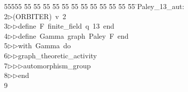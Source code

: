 %
%
\begin{tabbing}
55555 \= 55 \= 55 \= 55 \= 55 \= 55 \= 55 \= 55 \= 55 \= 55 \= 55 \= 55 \= 55 \= \>Paley\_13\_aut:\\[0pt]
2\>$\triangleright$\>(ORBITER)\ v\ 2\ \\[0pt]
3\>$\triangleright$\>$\triangleright$\>define\ F\ finite\_field\ q\ 13\ end\ \\[0pt]
4\>$\triangleright$\>$\triangleright$\>define\ Gamma\ graph\ Paley\ F\ end\ \\[0pt]
5\>$\triangleright$\>$\triangleright$\>with\ Gamma\ do\ \\[0pt]
6\>$\triangleright$\>$\triangleright$\>graph\_theoretic\_activity\ \\[0pt]
7\>$\triangleright$\>$\triangleright$\>$\triangleright$\>automorphism\_group\ \\[0pt]
8\>$\triangleright$\>$\triangleright$\>end\ \\[0pt]
9\>\end{tabbing}
